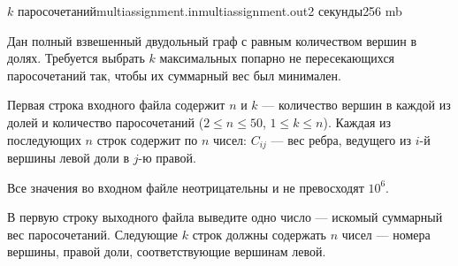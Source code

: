 \begin{problem}{$k$ паросочетаний}{multiassignment.in}{multiassignment.out}{2 секунды}{256 mb}

Дан полный взвешенный двудольный граф с равным количеством вершин в долях.
Требуется выбрать $k$ максимальных попарно не пересекающихся паросочетаний так,
чтобы их суммарный вес был минимален.

\InputFile

Первая строка входного файла содержит $n$ и $k$ --- количество вершин в каждой из долей и количество паросочетаний ($2 \le n \le 50$, $1 \le k \le n$).
Каждая из последующих $n$ строк содержит по $n$ чисел: $C_{ij}$ --- вес ребра, ведущего из $i$-й вершины
левой доли в $j$-ю правой. 

Все значения во входном файле неотрицательны и не превосходят $10^6$. 
 
\OutputFile

В первую строку выходного файла выведите одно число --- искомый суммарный
вес паросочетаний.
Следующие $k$ строк должны содержать $n$ чисел --- номера вершины, правой доли, соответствующие вершинам левой.

\Examples

\begin{example}
%
\end{example}

\end{problem}
